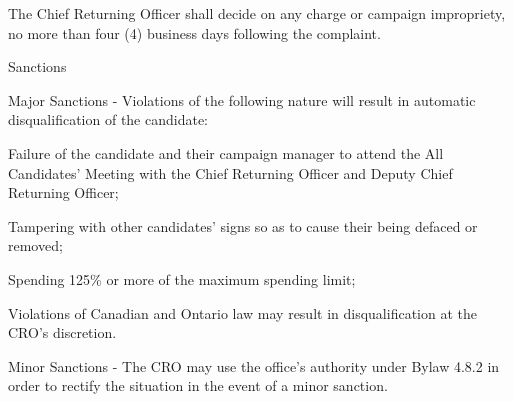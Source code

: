 \begin{longenum}[label*=\arabic*., align=left]
\begin{longenum}[label*=\arabic*., align=left]
\item The Chief Returning Officer shall decide on any charge or campaign impropriety, no more than four (4) business days following the complaint.
\item Sanctions
	\begin{longenum}[label*=\arabic*., align=left]
\item Major Sanctions - Violations of the following nature will result in automatic disqualification of the candidate:
	\begin{longenum}[label*=\arabic*., align=left]
\item Failure of the candidate and their campaign manager to attend the All Candidates' Meeting with the Chief Returning Officer and Deputy Chief Returning Officer;
\item Tampering with other candidates' signs so as to cause their being defaced or removed;
\item Spending 125\% or more of the maximum spending limit;
\item Violations of Canadian and Ontario law may result in disqualification at the CRO's discretion.
\end{longenum}
\item Minor Sanctions - The CRO may use the office's authority under Bylaw 4.8.2 in order to 
rectify the situation in the event of a minor sanction.
\end{longenum}
 \end{longenum}
 

\end{longenum}
